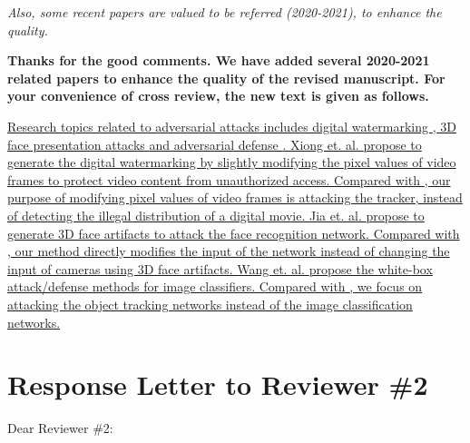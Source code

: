 \documentclass[12pt]{article}
\begin{document}
\textit{Also, some recent papers are valued to be referred (2020-2021), to enhance the quality.}

\textbf{Thanks for the good comments. We have added several 2020-2021 related papers to enhance the quality of the revised manuscript. For your convenience of cross review, the new text is given as follows.}

\uline{Research topics related to adversarial attacks includes digital watermarking \cite{9343885}, 3D face presentation attacks \cite{9294085} and adversarial defense \cite{9169672}.
Xiong et. al. \cite{9343885} propose to generate the digital watermarking by slightly modifying the pixel values of video frames to protect video content from unauthorized access. Compared with \cite{9343885}, our purpose of modifying pixel values of video frames is attacking the tracker, instead of detecting the illegal distribution of a digital movie.
Jia et. al. \cite{9294085} propose to generate 3D face artifacts to attack the face recognition network. Compared with \cite{9294085}, our method directly modifies the input of the network instead of changing the input of cameras using 3D face artifacts.
Wang et. al. \cite{9169672} propose the white-box attack/defense methods for image classifiers. Compared with \cite{9169672}, we focus on attacking the object tracking networks instead of the image classification networks.}

\newpage
{\centering\section*{Response Letter to Reviewer \#2}}
\noindent Dear Reviewer \#2:
\end{document}
